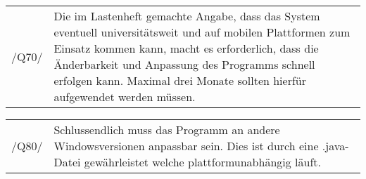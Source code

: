 \begin{tabular}{p{1.5cm}p{14.5cm}}
 /Q70/	& Die im Lastenheft gemachte Angabe, dass das System eventuell universitätsweit und auf mobilen Plattformen zum Einsatz kommen kann, macht es erforderlich, dass die Änderbarkeit und Anpassung des Programms schnell erfolgen kann. Maximal drei Monate sollten hierfür aufgewendet werden müssen. \\[0.25cm]	 
\end{tabular}
 
\begin{tabular}{p{1.5cm}p{14.5cm}}
 /Q80/	& Schlussendlich muss das Programm an andere Windowsversionen anpassbar sein. Dies ist durch eine .java-Datei gewährleistet welche plattformunabhängig läuft. \\[0.25cm]	 
\end{tabular} 
 